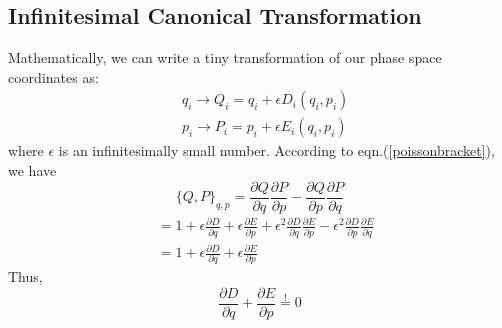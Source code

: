\subsection{Infinitesimal Canonical Transformation}
Mathematically, we can write a tiny transformation of our phase space coordinates as:
\begin{equation}
\begin{aligned}
&q_{i} \rightarrow Q_{i}=q_{i}+\epsilon D_{i}\left(q_{i}, p_{i}\right)\\
&p_{i} \rightarrow P_{i}=p_{i}+\epsilon E_{i}\left(q_{i}, p_{i}\right)
\end{aligned}
\label{infitrans}
\end{equation}
where $\epsilon$ is an infinitesimally small number. According to eqn.(\ref{poissonbracket}), we have
$$
\{Q, P\}_{q, p}=\frac{\partial Q}{\partial q} \frac{\partial P}{\partial p}-\frac{\partial Q}{\partial p} \frac{\partial P}{\partial q}
$$
$$
\begin{aligned}
&=1+\epsilon \frac{\partial D}{\partial q}+\epsilon \frac{\partial E}{\partial p}+\epsilon^{2} \frac{\partial D}{\partial q} \frac{\partial E}{\partial p}-\epsilon^{2} \frac{\partial D}{\partial p} \frac{\partial E}{\partial q}\\
&=1+\epsilon \frac{\partial D}{\partial q}+\epsilon \frac{\partial E}{\partial p}
\end{aligned}
$$
Thus,
\begin{equation}
    \frac{\partial D}{\partial q}+\frac{\partial E}{\partial p} \stackrel{!}{=} 0
\end{equation}

